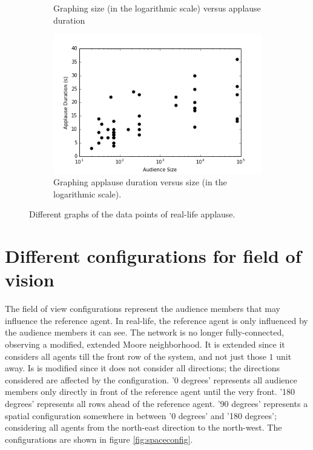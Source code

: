\begin{figure}[h]
\begin{subfigure}[b]{0.4\linewidth}
    \caption{Graphing size (in the logarithmic scale) versus applause duration}
  \end{subfigure}
    \begin{subfigure}[b]{0.4\linewidth}
    \includegraphics[width=\linewidth]{images/chapter4/4.png}
    \caption{Graphing applause duration versus size (in the logarithmic scale).}
  \end{subfigure}
  \caption{Different graphs of the data points of real-life applause.}
  \label{fig:realclap}
\end{figure}


\section{Different configurations for field of vision}

\hspace{\parindent}The field of view configurations represent the audience members that may influence the reference agent.
In real-life, the  reference agent is only influenced by the audience members it can see.
The network is no longer fully-connected, observing a modified, extended Moore neighborhood.
It is extended since it considers all agents till the front row of the system, and not just those $1$ unit away.
Is is modified since it does not consider all directions; the directions considered are affected by the configuration.
'0 degrees' represents all audience members only directly in front of the reference agent until the very front. 
'180 degrees' represents all rows ahead of the reference agent. 
'90 degrees' represents a spatial configuration somewhere in between '0 degrees' and '180 degrees'; considering all agents from the north-east direction to the north-west. The configurations are shown in figure \ref{fig:spaceconfig}.

